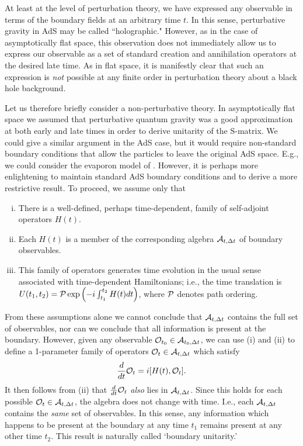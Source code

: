 \documentclass[12pt,onecolumn,eqsecnum,aps,prd,nofootinbib]{revtex4}
\begin{document}
At least at the level of perturbation theory, we have expressed any
observable in terms of the boundary fields at an arbitrary time $t$.  In this
sense, perturbative gravity in AdS may be called ``holographic."
However, as in the case of asymptotically flat space, this
observation does not immediately allow us to express our observable
as a set of standard creation and annihilation operators at the
desired late time.  As in flat space, it is manifestly clear that such an expression is {\it not} possible at any finite order in perturbation theory about a black hole
background.

Let us therefore briefly consider a non-perturbative theory.  In
asymptotically flat space we assumed that perturbative quantum
gravity was a good approximation at both early and late times in order to derive unitarity of the S-matrix.  We could give a similar argument in the AdS case, but it would require non-standard boundary conditions that allow the particles to leave the original AdS space.   E.g., we could consider the evaporon model of \cite{Jorge}.  However, it is perhaps more enlightening to maintain standard AdS boundary conditions and to derive a more restrictive result.  To proceed, we assume only that

\begin{enumerate}[i)]

\item  There is a well-defined, perhaps time-dependent, family of
self-adjoint operators $H(t)$.

\item  Each $H(t)$ is a member of the corresponding algebra
${\cal A}_{t, \Delta t}$ of boundary observables.

\item  This family of operators generates time evolution in
the usual sense associated with time-dependent Hamiltonians; i.e.,
the time translation is $U(t_1,t_2) = {\cal P}\exp \left( -i
\int_{t_1}^{t_2} H(t) dt \right)$, where ${\cal P}$ denotes path ordering.
\end{enumerate}


From these assumptions alone we cannot conclude that ${\cal A}_{t, \Delta t}$ contains the full set of observables, nor can we conclude that all
information is present at the boundary. However, given any observable ${\cal O}_{t_0} \in {\cal A}_{t_0, \Delta t}$, we can use (i) and (ii) to define a 1-parameter family of operators ${\cal O}_{t} \in {\cal A}_{t, \Delta t}$ which satisfy
\begin{equation}
\frac{d}{dt} {\cal O}_t = i[H(t), {\cal O}_t].
\end{equation}
It then follows from (ii) that $\frac{d}{dt} {\cal O}_t$ {\it also} lies in ${\cal A}_{t, \Delta t}$.  Since this holds for each possible ${\cal O}_{t} \in {\cal A}_{t, \Delta t}$, the algebra does not change with time.  I.e., each ${\cal A}_{t, \Delta t}$ contains the {\em same} set of observables.  In this sense, any information which happens to be present at the boundary at any time $t_1$ remains present at any
other time $t_2$. This result is naturally called  `boundary unitarity.'
\end{document}
